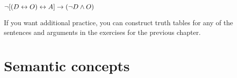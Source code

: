 \begin{compactlist}
%	


\item	$\neg [(D \leftrightarrow O) \leftrightarrow A] \rightarrow (\neg D \wedge O) $

\end{compactlist}


If you want additional practice, you can construct truth tables for any of the sentences and arguments in the exercises for the previous chapter.


\chapter{Semantic concepts}
\label{s:SemanticConcepts}

